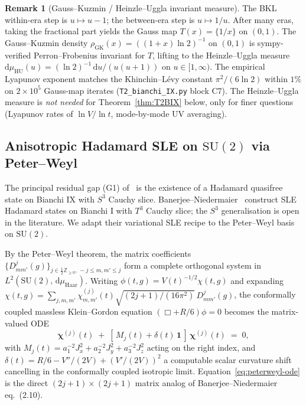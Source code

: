\documentclass[11pt]{article}
\theoremstyle{definition}
\newtheorem{remark}[theorem]{Remark}
\newcommand{\Z}{\mathbb{Z}}
\begin{document}
\begin{remark}[Gauss--Kuzmin / Heinzle--Uggla invariant measure]\label{rem:HU-measure}
The BKL within-era step is $u\mapsto u-1$; the between-era step is $u\mapsto 1/u$. After many eras, taking the fractional part yields the Gauss map $T(x)=\{1/x\}$ on $(0,1)$. The Gauss--Kuzmin density $\rho_{\mathrm{GK}}(x) = ((1+x)\ln 2)^{-1}$ on $(0,1)$ is sympy-verified Perron--Frobenius invariant for $T$, lifting to the Heinzle--Uggla measure $\mathrm{d}\mu_{\mathrm{HU}}(u) = (\ln 2)^{-1}\,\mathrm{d}u/(u(u+1))$ on $u\in[1,\infty)$. The empirical Lyapunov exponent matches the Khinchin--L\'evy constant $\pi^2/(6\ln 2)$ within $1\%$ on $2\times 10^5$ Gauss-map iterates (\texttt{T2\_bianchi\_IX.py} block C7). The Heinzle--Uggla measure is \emph{not needed} for Theorem~\ref{thm:T2BIX} below, only for finer questions (Lyapunov rates of $\ln V/\ln t$, mode-by-mode UV averaging).
\end{remark}

\subsection{\texorpdfstring{Anisotropic Hadamard SLE on $\mathrm{SU}(2)$ via Peter--Weyl}{Anisotropic Hadamard SLE on SU(2) via Peter-Weyl}}\label{sec:bianchi-IX-Hadamard}

The principal residual gap (G1) of~\cite{T2_bianchi_IX_note} is the existence of a Hadamard quasifree state on Bianchi IX with $S^3$ Cauchy slice. Banerjee--Niedermaier~\cite{BanerjeeNiedermaier2023} construct SLE Hadamard states on Bianchi I with $T^3$ Cauchy slice; the $S^3$ generalisation is open in the literature. We adapt their variational SLE recipe to the Peter--Weyl basis on $\mathrm{SU}(2)$.

By the Peter--Weyl theorem, the matrix coefficients $\{D^j_{m m'}(g)\}_{j\in\frac12\Z_{\ge 0},\,-j\le m,m'\le j}$ form a complete orthogonal system in $L^2(\mathrm{SU}(2),\,\mathrm{d}\mu_{\mathrm{Haar}})$. Writing $\phi(t,g) = V(t)^{-1/2}\chi(t,g)$ and expanding $\chi(t,g) = \sum_{j,m,m'}\chi^{(j)}_{m,m'}(t)\sqrt{(2j+1)/(16\pi^2)}\,D^j_{mm'}(g)$, the conformally coupled massless Klein--Gordon equation $(\Box+R/6)\phi=0$ becomes the matrix-valued ODE
\begin{equation}\label{eq:peterweyl-ode}
\ddot{\boldsymbol\chi}^{(j)}(t) \;+\; [\,M_j(t)+\delta(t)\,\mathbf 1\,]\,\boldsymbol\chi^{(j)}(t) \;=\; 0,
\end{equation}
with $M_j(t) = a_1^{-2}J_x^2 + a_2^{-2}J_y^2 + a_3^{-2}J_z^2$ acting on the right index, and $\delta(t) = R/6 - V''/(2V) + (V'/(2V))^2$ a computable scalar curvature shift cancelling in the conformally coupled isotropic limit. Equation~\eqref{eq:peterweyl-ode} is the direct $(2j+1)\times(2j+1)$ matrix analog of Banerjee--Niedermaier eq.~(2.10).
\end{document}

